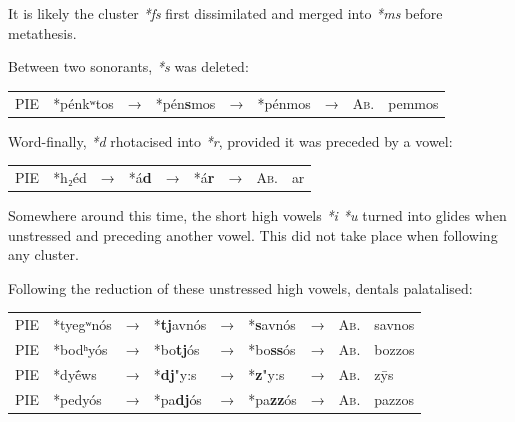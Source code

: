 \documentclass[svgnames,x11names,b5paper]{book}
\begin{document}
            It is likely the cluster \textit{*fs} first dissimilated and merged into \textit{*ms} before metathesis.

        Between two sonorants, \textit{*s} was deleted:

            \begin{table}[H]
                \begin{center}
                \begin{tabular}{llcllllll}
                \textsc{PIE} & *pénkʷtos & → & *pén\textbf{s}mos & → & *pénmos & → & \textsc{Ab.} & pemmos\\
                \end{tabular}
                \end{center}
                \end{table}
        
        Word-finally, \textit{*d} rhotacised into \textit{*r}, provided it was preceded by a vowel:

            \begin{table}[H]
                \begin{center}
                \begin{tabular}{llcllllll}
                \textsc{PIE} & *h₂éd & → & *á\textbf{d} & → & *á\textbf{r} & → & \textsc{Ab.} & ar\\
                \end{tabular}
                \end{center}
                \end{table}
        
        Somewhere around this time, the short high vowels \textit{*i *u} turned into glides when unstressed and preceding another vowel. This did not take place when following any cluster.

        Following the reduction of these unstressed high vowels, dentals palatalised:

            \begin{table}[H]
                \begin{center}
                \begin{tabular}{llcllllll}
                \textsc{PIE} & *tyegʷnós & → & *\textbf{tj}avnós & → & *\textbf{s}avnós & → & \textsc{Ab.} & savnos\\
                \textsc{PIE} & *bodʰyós & → & *bo\textbf{tj}ós & → & *bo\textbf{ss}ós & → & \textsc{Ab.} & bozzos\\
                \textsc{PIE} & *dyḗws & → & *\textbf{dj}"y:s & → & *\textbf{z}"y:s & → & \textsc{Ab.} & zȳs\\
                \textsc{PIE} & *pedyós & → & *pa\textbf{dj}ós & → & *pa\textbf{zz}ós & → & \textsc{Ab.} & pazzos\\
                \end{tabular}
                \end{center}
                \end{table}
        
\end{document}
